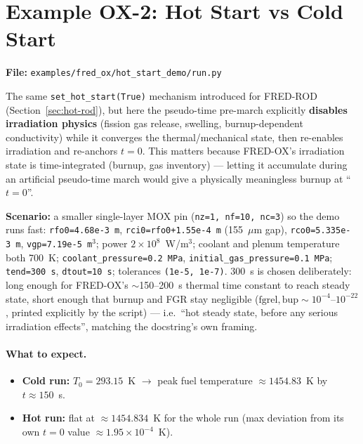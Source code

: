 \documentclass[11pt,a4paper]{article}
\begin{document}
\section{Example OX-2: Hot Start vs Cold Start}
\label{sec:hot-ox}

\textbf{File:} \texttt{examples/fred\_ox/hot\_start\_demo/run.py}

\medskip
The same \texttt{set\_hot\_start(True)} mechanism introduced for FRED-ROD
(Section~\ref{sec:hot-rod}), but here the pseudo-time pre-march explicitly
\textbf{disables irradiation physics} (fission gas release, swelling,
burnup-dependent conductivity) while it converges the thermal/mechanical
state, then re-enables irradiation and re-anchors $t=0$.  This matters
because FRED-OX's irradiation state is time-integrated (burnup, gas
inventory) --- letting it accumulate during an artificial pseudo-time march
would give a physically meaningless burnup at ``$t=0$''.

\textbf{Scenario:} a smaller single-layer MOX pin (\texttt{nz=1, nf=10,
nc=3}) so the demo runs fast: \texttt{rfo0=4.68e-3~m},
\texttt{rci0=rfo0+1.55e-4~m} (155~$\mu$m gap), \texttt{rco0=5.335e-3~m},
\texttt{vgp=7.19e-5~m$^3$}; power $2\times10^8$~W/m$^3$; coolant and plenum
temperature both 700~K; \texttt{coolant\_pressure=0.2~MPa},
\texttt{initial\_gas\_pressure=0.1~MPa}; \texttt{tend=300~s},
\texttt{dtout=10~s}; tolerances \texttt{(1e-5, 1e-7)}.  300~s is chosen
deliberately: long enough for FRED-OX's $\sim$150--200~s thermal time
constant to reach steady state, short enough that burnup and FGR stay
negligible ($\text{fgrel}, \text{bup} \sim 10^{-4}$--$10^{-22}$, printed
explicitly by the script) --- i.e.\ ``hot steady state, before any serious
irradiation effects'', matching the docstring's own framing.

\paragraph{What to expect.}

\begin{itemize}
  \item \textbf{Cold run:} $T_0=293.15$~K $\to$ peak fuel temperature
        $\approx 1454.83$~K by $t\approx150$~s.
  \item \textbf{Hot run:} flat at $\approx 1454.834$~K for the whole run
        (max deviation from its own $t=0$ value $\approx 1.95\times10^{-4}$~K).
\end{itemize}
\end{document}
